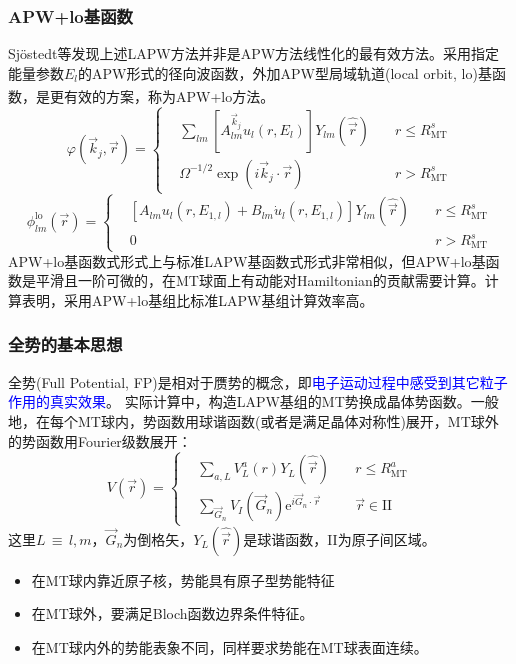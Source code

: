 \documentclass[cjk,slidestop,compress,mathserif,blue]{beamer}
\newcommand{\upcite}[1]{\hspace{0ex}\textsuperscript{\cite{#1}}} %
\begin{document}
\frame
{
\frametitle{\textrm{APW+lo}基函数}
\textrm{Sj\"ostedt}等发现上述\textrm{LAPW}方法并非是\textrm{APW}方法线性化的最有效方法。采用指定能量参数$E_l$的\textrm{APW}形式的径向波函数，外加\textrm{APW}型局域轨道(\textrm{local orbit, lo})基函数，是更有效的方案，称为\textrm{APW+lo}方法\upcite{SSC114-15_2000}。
$$  \varphi(\vec k_j,\vec r)=\left\{
  \begin{aligned}
    &\sum_{lm}[A^{\vec k_j}_{lm}u_l(r,E_l)]Y_{lm}(\hat{\vec r})\quad&r\leqslant R_{\mathrm{MT}}^s\\
    &\Omega^{-1/2}\exp(i\vec k_j\cdot\vec r) &r>R_{\mathrm{MT}}^s
  \end{aligned}\right.
  \label{eq:APW-basis}
$$
$$  \phi_{lm}^{\mathrm{lo}}(\vec r)=\left\{
  \begin{aligned}
  &[A_{lm}u_l(r,E_{1,l})+B_{lm}\dot u_l(r,E_{1,l})]Y_{lm}(\hat{\vec r})\quad&r\leqslant R_{\mathrm{MT}}^s\\
  &0&r>R_{\mathrm{MT}}^s
  \end{aligned}
\right.$$
\textrm{APW+lo}基函数式形式上与标准\textrm{LAPW}基函数式形式非常相似，但\textrm{APW+lo}基函数是平滑且一阶可微的，在\textrm{MT}球面上有动能对\textrm{Hamiltonian}的贡献需要计算。计算表明，采用\textrm{APW+lo}基组比标准\textrm{LAPW}基组计算效率高。
}

\frame
{
\frametitle{全势的基本思想}
全势\textrm{(Full Potential, FP)}是相对于赝势的概念，即\textcolor{blue}{电子运动过程中感受到其它粒子作用的真实效果}。
实际计算中，构造\textrm{LAPW}基组的\textrm{MT}势换成晶体势函数。一般地，在每个\textrm{MT}球内，势函数用球谐函数(或者是满足晶体对称性)展开，\textrm{MT}球外的势函数用\textrm{Fourier}级数展开：%
{\footnotesize$$ V(\vec r)=\left\{
  \begin{aligned}
    &\sum_{a,L}V_L^a(r)Y_L(\hat{\vec r})\quad &r\leqslant R_{\mathrm{MT}}^a\\
    &\sum_{\vec G_n}V_I(\vec G_n)\textrm{e}^{i\vec G_n\cdot\vec r} &\vec r\in\mathrm{II}
  \end{aligned}\right.
  \label{eq:solid-63}
$$}
这里$L$\,$\equiv$\,$l,m$，$\vec G_n$为倒格矢，$Y_L(\hat{\vec r})$是球谐函数，\textrm{II}为原子间区域。
\begin{itemize}
	\item 在\textrm{MT}球内靠近原子核，势能具有原子型势能特征
	\item 在\textrm{MT}球外，要满足\textrm{Bloch}函数边界条件特征。
	\item 在\textrm{MT}球内外的势能表象不同，同样要求势能在\textrm{MT}球表面连续。
\end{itemize}
}
\end{document}
